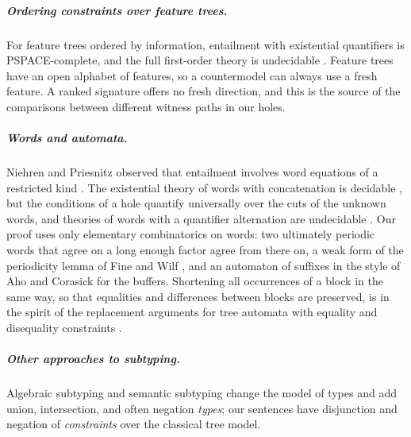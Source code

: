 \subparagraph*{Ordering constraints over feature trees.}
For feature trees ordered by information, entailment with existential quantifiers is
PSPACE-complete, and the full first-order theory is undecidable
\cite{MullerNiehrenTreinen98,MullerNiehrenTreinen01,MullerNiehrenPodelski00}. Feature trees
have an open alphabet of features, so a countermodel can always use a fresh feature. A
ranked signature offers no fresh direction, and this is the source of the comparisons
between different witness paths in our holes.

\subparagraph*{Words and automata.}
Niehren and Priesnitz observed that entailment involves word equations of a restricted kind
\cite{NiehrenPriesnitz03}. The existential theory of words with concatenation is decidable
\cite{Makanin77,Plandowski04,Schulz92}, but the conditions of a hole quantify universally
over the cuts of the unknown words, and theories of words with a quantifier alternation are
undecidable \cite{Durnev95}. Our proof uses only elementary combinatorics on words: two
ultimately periodic words that agree on a long enough factor agree from there on, a weak
form of the periodicity lemma of Fine and Wilf \cite{FineWilf65,Lothaire02}, and an
automaton of suffixes in the style of Aho and Corasick \cite{AhoCorasick75} for the
buffers. Shortening all occurrences of a block in the same way, so that equalities and
differences between blocks are preserved, is in the spirit of the replacement arguments for
tree automata with equality and disequality constraints
\cite{BogaertTison92,DauchetCaronCoquide95,ComonJacquemard03,FiliotTalbotTison10,BargunoEtAl10,TATA}.

\subparagraph*{Other approaches to subtyping.}
Algebraic subtyping \cite{DolanMycroft17,Dolan16,Parreaux20,ParreauxChau22} and semantic
subtyping \cite{CastagnaXu11,GesbertGenevesLayaida15} change the model of types and add
union, intersection, and often negation \emph{types}; our sentences have disjunction and
negation of \emph{constraints} over the classical tree model.
